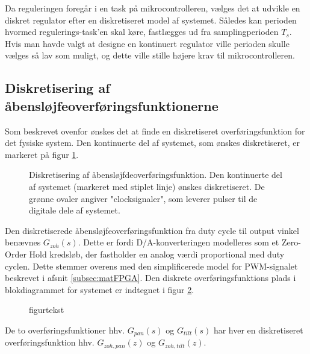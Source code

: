 Da reguleringen foregår i en task på mikrocontrolleren, vælges det
at udvikle en diskret regulator efter en diskretiseret model af systemet.
Således kan perioden hvormed regulerings-task'en skal køre, fastlægges ud fra
samplingperioden \(T_s\). Hvis man havde valgt at designe en kontinuert regulator
ville perioden skulle vælges så lav som muligt, og dette ville stille højere krav
til mikrocontrolleren.

\subsection{Diskretisering af åbensløjfeoverføringsfunktionerne}
Som beskrevet ovenfor ønskes det at finde en diskretiseret overføringsfunktion
for det fysiske system. Den kontinuerte del af systemet, som ønskes diskretiseret,
er markeret på figur \ref{fig:digitalkontroller2}.
\begin{figure}[!th]
\centering
\begin{tikzpicture}[auto, node distance=2.6cm,>=latex']

\end{tikzpicture}
\caption[Diskretisering af åbensløjfeoverføringsfunktion]{Diskretisering af åbensløjfdeoverføringsfunktion.
	Den kontinuerte del af systemet (markeret med stiplet linje) ønskes diskretiseret.
	De grønne ovaler angiver "clocksignaler", som leverer pulser til de digitale dele af systemet.}
\label{fig:digitalkontroller2}
\end{figure}

Den diskretiserede åbensløjfeoverføringsfunktion fra duty cycle til output vinkel
benævnes \(G_{zoh}\left(s\right)\). Dette er fordi D/A-konverteringen modelleres som et Zero-Order Hold kredsløb,
der fastholder en analog værdi proportional med duty cyclen. Dette stemmer overens med den simplificerede
model for PWM-signalet beskrevet i afsnit \ref{subsec:matFPGA}.
Den diskrete overføringsfunktions plads i blokdiagrammet for systemet
er indtegnet i figur \ref{fig:digitalkontroller3}.
\begin{figure}[!th]
\centering
\begin{tikzpicture}[auto, node distance=2.6cm,>=latex']

\end{tikzpicture}
\caption[tekst i indholdsfortegnelsen]{figurtekst}
\label{fig:digitalkontroller3}
\end{figure}
De to overføringsfunktioner hhv. \(G_{pan}\left(s\right)\) og \(G_{tilt}\left(s\right)\)
har hver en diskretiseret overføringsfunktion hhv. \(G_{zoh,pan}\left(z\right)\) og \(G_{zoh,tilt}\left(z\right)\).


